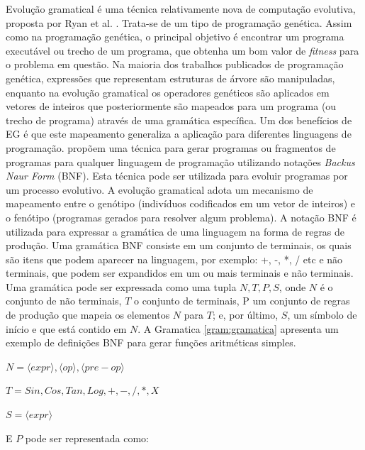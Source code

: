 Evolução gramatical é uma técnica relativamente nova de computação evolutiva, proposta por Ryan et al. \cite{ryan1998grammatical}. Trata-se de um tipo de programação genética. Assim como na programação genética, o principal objetivo é encontrar um programa executável ou trecho de um programa, que obtenha um bom valor de \textit{fitness} para o problema em questão. Na maioria dos trabalhos publicados de programação genética, expressões que representam estruturas de árvore são manipuladas, enquanto na evolução gramatical os operadores genéticos são aplicados em vetores de inteiros que posteriormente são mapeados para um programa (ou trecho de programa) através de uma gramática específica. Um dos benefícios de EG é que este mapeamento generaliza a aplicação para diferentes linguagens de programação. \cite{ryan1998grammatical} propõem uma técnica para gerar programas ou fragmentos de programas para qualquer linguagem de programação utilizando notações \textit{Backus Naur Form} (BNF). Esta técnica pode ser utilizada para evoluir programas por um processo evolutivo. A evolução gramatical adota um mecanismo de mapeamento entre o genótipo (indivíduos codificados em um vetor de inteiros) e o fenótipo (programas gerados para resolver algum problema). 
A notação BNF é utilizada para expressar a gramática de uma linguagem na forma de regras de produção. Uma gramática BNF consiste em um conjunto de terminais, os quais são itens que podem aparecer na linguagem, por exemplo: +, -, *, / etc e não terminais, que podem ser expandidos em um ou mais terminais e não terminais. Uma gramática pode ser expressada como uma tupla ${N,T,P,S}$, onde $N$ é o conjunto de não terminais, $T$ o conjunto de terminais, P um conjunto de regras de produção que mapeia os elementos $N$ para $T$; e, por último, $S$, um símbolo de início e que está contido em $N$.
A Gramatica \ref{gram:gramatica} apresenta um exemplo de definições BNF para gerar funções aritméticas simples.

\begin{center}
	
	$ N = {\langle expr \rangle, \langle op \rangle, \langle pre-op \rangle}$
	
	$ T = {Sin,Cos,Tan,Log,+,-,/,*,X} $
	
	$ S = \langle expr \rangle $
	
\end{center}

\noindent
E $P$ pode ser representada como:

